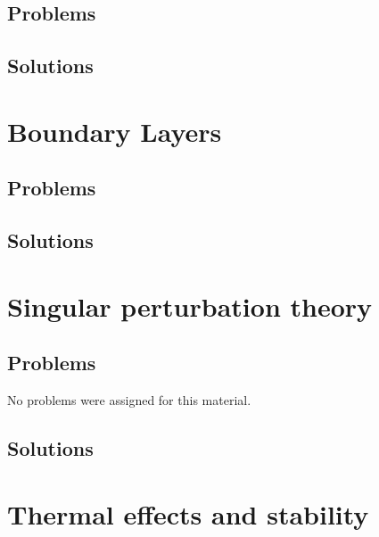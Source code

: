    \section{Problems}
      
   \section{Solutions}
      \shipoutAnswer

\chapter{Boundary Layers}
   
   
   
   
   
   \section{Problems}
      
      
   \section{Solutions}
      \shipoutAnswer

\chapter{Singular perturbation theory}
   
   
   
   \section{Problems}
      No problems were assigned for this material.
   \section{Solutions}
      \shipoutAnswer

\chapter{Thermal effects and stability}
   
   
   
